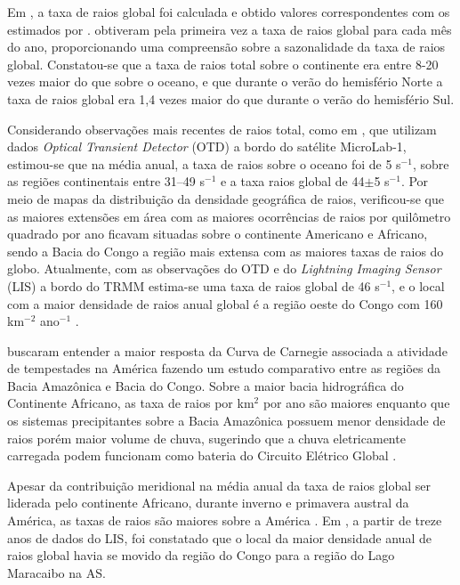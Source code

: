 Em , a taxa de raios global foi calculada e obtido valores correspondentes com os estimados por .   obtiveram pela primeira vez a taxa de raios global para cada mês do ano, proporcionando uma compreensão sobre a sazonalidade da taxa de raios global. Constatou-se que a taxa de raios total sobre o continente era entre 8-20 vezes maior do que sobre o oceano, e que durante o verão do hemisfério Norte a taxa de raios global era 1,4 vezes maior do que durante o verão do hemisfério Sul.


Considerando observações mais recentes de raios total, como em \cite{christian2003global}, que utilizam dados \textit{Optical Transient Detector} (OTD) a bordo do satélite MicroLab-1,  estimou-se que na média anual, a taxa de raios sobre o oceano foi de 5 s$^{-1}$, sobre as regiões continentais entre 31--49 s$^{-1}$ e a taxa raios global de 44$\pm$5 s$^{-1}$. Por meio de mapas da distribuição da densidade geográfica de raios, verificou-se que as maiores extensões em área com as maiores ocorrências de raios por quilômetro quadrado por ano ficavam situadas sobre o continente Americano e Africano, sendo a Bacia do Congo a região mais extensa com as maiores taxas de raios do globo. Atualmente, com as observações do OTD e do \textit{Lightning Imaging Sensor} (LIS) a bordo do TRMM estima-se uma taxa de raios global de 46 s$^{-1}$, e o local com a maior densidade de raios anual global é a região oeste do Congo com 160   km$^{-2}$ ano$^{-1}$ \cite{cecil2014gridded}.

 buscaram entender a maior resposta da Curva de Carnegie associada a atividade de tempestades na América  fazendo um estudo comparativo entre as regiões da Bacia Amazônica e Bacia do Congo. Sobre a maior bacia hidrográfica do Continente Africano, as taxa de raios por km$^2$ por ano são maiores enquanto que os sistemas precipitantes sobre a Bacia Amazônica possuem menor densidade de raios porém maior volume de chuva, sugerindo que a chuva eletricamente carregada podem funcionam como bateria do Circuito Elétrico Global \cite{soula2003surface}.

Apesar da contribuição meridional na média anual da taxa de raios global ser liderada pelo continente Africano, durante inverno e primavera austral da América, as taxas de raios são maiores sobre a América \cite{christian2003global}. Em , a partir de treze anos de dados do LIS, foi constatado que o local da maior densidade anual de raios global havia se movido da região do Congo para a região do Lago Maracaibo na AS.


